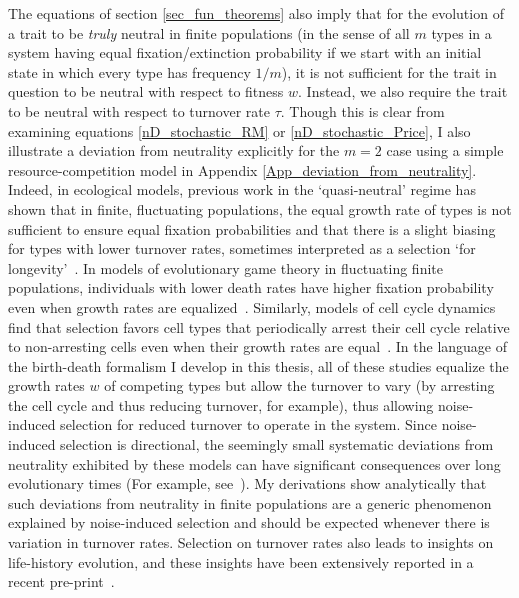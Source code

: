 The equations of section \ref{sec_fun_theorems} also imply that for the evolution of a trait to be \emph{truly} neutral in finite populations (in the sense of all $m$ types in a system having equal fixation/extinction probability if we start with an initial state in which every type has frequency $1/m$), it is not sufficient for the trait in question to be neutral with respect to fitness $w$. Instead, we also require the trait to be neutral with respect to turnover rate $\tau$. Though this is clear from examining equations \eqref{nD_stochastic_RM} or \eqref{nD_stochastic_Price}, I also illustrate a deviation from neutrality explicitly for the $m=2$ case using a simple resource-competition model in Appendix \ref{App_deviation_from_neutrality}. Indeed, in ecological models, previous work in the `quasi-neutral' regime has shown that in finite, fluctuating populations, the equal growth rate of types is not sufficient to ensure equal fixation probabilities and that there is a slight biasing for types with lower turnover rates, sometimes interpreted as a selection `for longevity'~\citep{lin_features_2012, oliveira_advantage_2017,balasekaran_quasi-neutral_2022}. In models of evolutionary game theory in fluctuating finite populations, individuals with lower death rates have higher fixation probability even when growth rates are equalized~\citep{huang_stochastic_2015, czuppon_fixation_2018}. Similarly, models of cell cycle dynamics find that selection favors cell types that periodically arrest their cell cycle relative to non-arresting cells even when their growth rates are equal~\citep{wodarz_effect_2017}. In the language of the birth-death formalism I develop in this thesis, all of these studies equalize the growth rates $w$ of competing types but allow the turnover to vary (by arresting the cell cycle and thus reducing turnover, for example), thus allowing noise-induced selection for reduced turnover to operate in the system. Since noise-induced selection is directional, the seemingly small systematic deviations from neutrality exhibited by these models can have significant consequences over long evolutionary times (For example, see~\cite{veller_drift-induced_2017}). My derivations show analytically that such deviations from neutrality in finite populations are a generic phenomenon explained by noise-induced selection and should be expected whenever there is variation in turnover rates. Selection on turnover rates also leads to insights on life-history evolution, and these insights have been extensively reported in a recent pre-print~\citep{kuosmanen_turnover_2022}.

